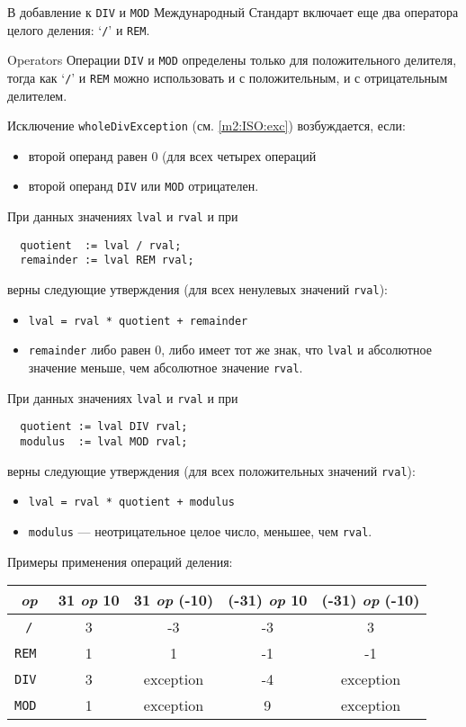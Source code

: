 В добавление к {\tt DIV} и {\tt MOD} Международный Стандарт
включает еще два оператора целого деления:
`\verb+/+' и {\tt REM}.

Operators 
Операции {\tt DIV} и {\tt MOD} определены только для положительного
делителя, тогда как `\verb+/+' и {\tt REM} можно использовать и
с положительным, и с отрицательным делителем.

Исключение {\tt wholeDivException} (см. \ref{m2:ISO:exc})
возбуждается, если:
\begin{itemize}
\item второй операнд равен 0 (для всех четырех операций
\item второй операнд {\tt DIV} или {\tt MOD} отрицателен.
\end{itemize}

При данных значениях {\tt lval} и {\tt rval} и при
\begin{verbatim}
  quotient  := lval / rval;
  remainder := lval REM rval;
\end{verbatim}
верны следующие утверждения (для всех ненулевых значений {\tt rval}):
\begin{itemize}
\item \verb'lval = rval * quotient + remainder'

\item {\tt remainder} либо равен 0, либо имеет тот же знак, что
{\tt lval} и абсолютное значение меньше, чем абсолютное значение 
{\tt rval}.
\end{itemize}

При данных значениях {\tt lval} и {\tt rval} и при
\begin{verbatim}
  quotient := lval DIV rval;
  modulus  := lval MOD rval;
\end{verbatim}
верны следующие утверждения (для всех положительных значений {\tt rval}):
\begin{itemize}
\item \verb'lval = rval * quotient + modulus'

\item {\tt modulus} --- неотрицательное целое число, меньшее, чем {\tt rval}.
\end{itemize}

Примеры применения операций деления:
\begin{center}
\begin{tabular}{|c|c|c|c|c|} \hline
{\em op} & 31 {\em op} 10 & 31 {\em op} (-10) & (-31) {\em op} 10 & (-31) {\em op} (-10) \\ \hline
\verb+/+ &  3  & -3         &  -3  & 3          \\ \hline
\tt REM  &  1  & 1          &  -1  & -1         \\ \hline
\tt DIV  &  3  & exception  &  -4  & exception  \\ \hline
\tt MOD  &  1  & exception  &   9  & exception  \\ \hline
\end{tabular}
\end{center}

